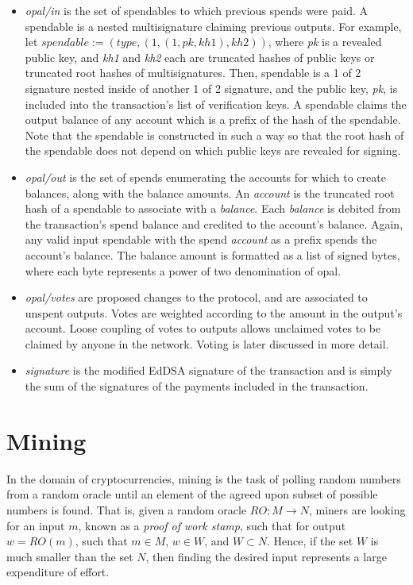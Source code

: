 \documentclass[10pt,twocolumn]{article}
\begin{document}
\begin{itemize}
\item {\em opal/in} is the set of spendables to which previous spends were paid.  A spendable is a nested multisignature claiming previous outputs.  For example, let $spendable := (type, (1, (1, pk, kh1), kh2))$, where {\em pk} is a revealed public key, and {\em kh1} and {\em kh2} each are truncated hashes of public keys or truncated root hashes of multisignatures.  Then, spendable is a 1 of 2 signature nested inside of another 1 of 2 signature, and the public key, {\em pk}, is included into the transaction's list of verification keys.  A spendable claims the output balance of any account which is a prefix of the hash of the spendable.  Note that the spendable is constructed in such a way so that the root hash of the spendable does not depend on which public keys are revealed for signing.

\item {\em opal/out} is the set of spends enumerating the accounts for which to create balances, along with the balance amounts.  An {\em account} is the truncated root hash of a spendable to associate with a {\em balance}.  Each {\em balance} is debited from the transaction's spend balance and credited to the account's balance.  Again, any valid input spendable with the spend {\em account} as a prefix spends the account's balance.  The balance amount is formatted as a list of signed bytes, where each byte represents a power of two denomination of opal.

\item {\em opal/votes} are proposed changes to the protocol, and are associated to unspent outputs.  Votes are weighted according to the amount in the output's account.  Loose coupling of votes to outputs allows unclaimed votes to be claimed by anyone in the network.  Voting is later discussed in more detail.

\item {\em signature} is the modified EdDSA signature of the transaction and is simply the sum of the signatures of the payments included in the transaction.
\end{itemize}

\section{Mining}
In the domain of cryptocurrencies, mining is the task of polling random numbers from a random oracle until an element of the agreed upon subset of possible numbers is found.  That is, given a random oracle $RO:M \to N$, miners are looking for an input $m$, known as a {\em proof of work stamp}, such that for output $w = RO(m)$, such that $m \in M$, $w \in W$, and $W \subset N$.  Hence, if the set $W$ is much smaller than the set $N$, then finding the desired input represents a large expenditure of effort.
\end{document}
